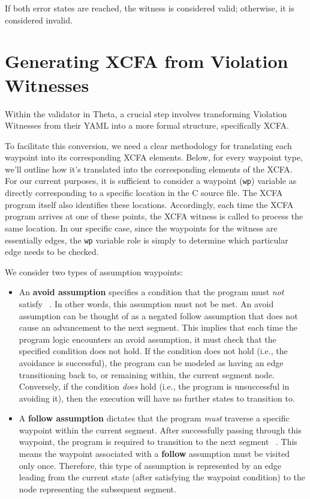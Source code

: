 If both error states are reached, the witness is considered valid; otherwise, it is considered invalid.

\section{Generating XCFA from Violation Witnesses}
Within the validator in Theta, a crucial step involves transforming Violation Witnesses 
from their YAML into a more formal structure, specifically XCFA.

To facilitate this conversion, we need a clear methodology for translating each waypoint into 
its corresponding XCFA elements. Below, for every waypoint type, we'll outline how it's translated into 
the corresponding elements of the XCFA.
For our current purposes, it is sufficient to consider a waypoint (\texttt{wp}) variable as directly corresponding 
to a specific location in the C source file. The XCFA program itself also identifies these locations. 
Accordingly, each time the XCFA program arrives at one of these points, the XCFA witness
is called to process the same location. 
In our specific case, since the waypoints for the witness are essentially edges, the \texttt{wp} 
variable role is simply to determine which particular edge needs to be checked.

We consider two types of assumption waypoints:
\begin{itemize}
  \item An \textbf{avoid assumption} specifies a condition that the program must 
    \textit{not} satisfy ~\cite{witness2}. In other words, this assumption must not be met.
    An avoid assumption can be thought of as a negated follow assumption that 
    does not cause an advancement to the next segment.
    This implies that each time the program logic encounters an avoid assumption, 
    it must check that the specified condition does not hold.
    If the condition does not hold (i.e., the avoidance is successful), the program can 
    be modeled as having an edge transitioning back to, or remaining within, the current segment node.
    Conversely, if the condition \emph{does} hold (i.e., the program is unsuccessful in avoiding it), 
    then the execution will have no further states to transition to.
  \item A \textbf{follow assumption} dictates that the program \textit{must} 
    traverse a specific waypoint within the current segment.
    After successfully passing through this waypoint, the program is required to transition 
    to the next segment ~\cite{witness2}. This means the waypoint associated with a \textbf{follow} assumption 
    must be visited only once.
    Therefore, this type of assumption is represented by an edge leading from the current 
    state (after satisfying the waypoint condition) to the node representing the subsequent segment.
\end{itemize}

